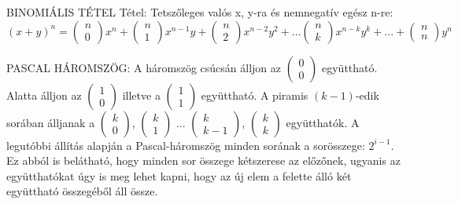 \begin{framed}
BINOMIÁLIS TÉTEL Tétel: Tetszőleges valós x, y-ra és nemnegatív egész n-re:$$
(x+y)^n = \begin{pmatrix}
n\\0
\end{pmatrix} x^n + \begin{pmatrix}
n\\1
\end{pmatrix} x^{n-1}y + \begin{pmatrix}
n\\2
\end{pmatrix} x^{n-2}y^2 + ... \begin{pmatrix}
n\\k
\end{pmatrix} x^{n-k}y^k + ... + \begin{pmatrix}
n\\n
\end{pmatrix} y^n$$
\end{framed}
\begin{shaded}
PASCAL HÁROMSZÖG: A háromszög csúcsán álljon az  $\begin{pmatrix}
0\\0
\end{pmatrix}$ együttható. Alatta álljon az $\begin{pmatrix}
1\\0
\end{pmatrix}$ illetve a $\begin{pmatrix}
1\\1
\end{pmatrix}$ együttható. A piramis $(k-1)$-edik sorában álljanak a $\begin{pmatrix}
k\\0
\end{pmatrix}$, $\begin{pmatrix}
k\\1
\end{pmatrix}$ ... $\begin{pmatrix}
k\\k-1
\end{pmatrix}$, $\begin{pmatrix}
k\\k
\end{pmatrix}$ együtthatók. A legutóbbi állítás alapján a Pascal-háromszög minden sorának a sorösszege:
$2^{i-1}$. Ez abból is belátható, hogy minden sor összege kétszerese az előzőnek, ugyanis az együtthatókat úgy is meg lehet kapni, hogy az új elem a felette álló két együttható összegéből áll össze.
\end{shaded}
